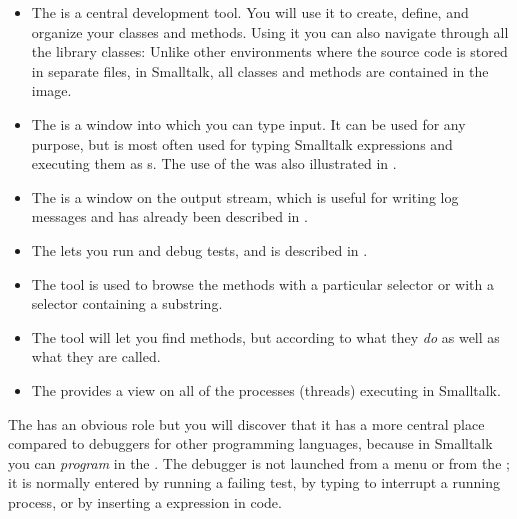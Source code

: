 \documentclass[a4paper,10pt,twoside]{book}
\begin{document}
\begin{itemize}
	\item {The } is a central development tool.
		You will use it to create, define, and organize your classes and methods.
		Using it you can also navigate through all the library classes:
		Unlike other environments where the source code is stored in separate files, in Smalltalk, all classes and methods are contained in the image.

	\item{The } is a window into which you can type input.
		It can be used for any purpose, but is most often used for typing Smalltalk expressions and executing them as s.
		The use of the  was also illustrated in .

	\item{The } is a window on the  output stream, which is useful for writing log messages and has already been described in .

	\item{The } lets you run and debug \SUnit tests, and is described in .

	\item{The } tool is used to browse the methods with a particular selector or with a selector containing a substring.

	\item{The } tool will let you find methods, but according to what they \emph{do} as well as what they are called.

	\item{The  provides a view on all of the processes (threads) executing in Smalltalk.}
\end{itemize}

The  has an obvious role but you will discover that it has a more central place compared to debuggers for other programming languages, because in Smalltalk you can \emph{program} in the .
The debugger is not launched from a menu or from the \toolsflap; it is normally entered by running a failing test, by typing  to interrupt a running process, or by inserting a  expression in code.
\end{document}
